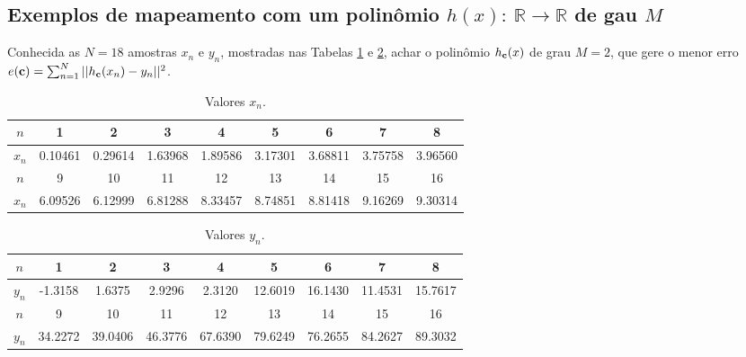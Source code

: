 \subsection{Exemplos de mapeamento com um polinômio
$h(x):~\mathbb{R} \rightarrow \mathbb{R}$ de gau $M$ }

\begin{example}\label{ex:theo:maphxr1r1}
Conhecida as $N=18$ amostras $x_n$ e $y_n$, mostradas nas  Tabelas \ref{table:theo:maphxr1r1:xn} e \ref{table:theo:maphxr1r1:yn},
achar o polinômio $h_{\VECTOR{c}}(x)$ de grau $M=2$, 
que gere o menor erro $e(\VECTOR{c}) =  \sum_{n=1}^{N} ||h_{\VECTOR{c}}(x_n)-y_n||^2$.
\end{example}


\begin{table}[h!]
\centering
\begin{tabular}{|c|c|c|c|c|c|c|c|c|} 
 \hline
$n$   & 1 & 2 & 3 & 4 & 5 & 6 & 7 & 8\\ \hline
$x_n$ & 0.10461 & 0.29614 & 1.63968 & 1.89586 & 3.17301 & 3.68811 & 3.75758 & 3.96560 \\ \hline
 \hline
$n$   & 9 & 10 & 11 & 12 & 13 & 14 & 15 & 16\\  \hline
$x_n$ & 6.09526 & 6.12999 & 6.81288 & 8.33457 & 8.74851 & 8.81418 & 9.16269 & 9.30314 \\ \hline
\end{tabular}
\caption{Valores $x_n$.}
\label{table:theo:maphxr1r1:xn}
\end{table}

\begin{table}[h!]
\centering
\begin{tabular}{|c|c|c|c|c|c|c|c|c|} 
 \hline
$n$   & 1 & 2 & 3 & 4 & 5 & 6 & 7 & 8\\ \hline
$y_n$ & -1.3158 & 1.6375 & 2.9296 & 2.3120 & 12.6019 & 16.1430 & 11.4531 & 15.7617  \\ \hline
 \hline
$n$   & 9 & 10 & 11 & 12 & 13 & 14 & 15 & 16\\  \hline
$y_n$ & 34.2272 & 39.0406 & 46.3776 & 67.6390 & 79.6249 & 76.2655 & 84.2627 & 89.3032 \\ \hline
\end{tabular}
\caption{Valores $y_n$.}
\label{table:theo:maphxr1r1:yn}
\end{table}

